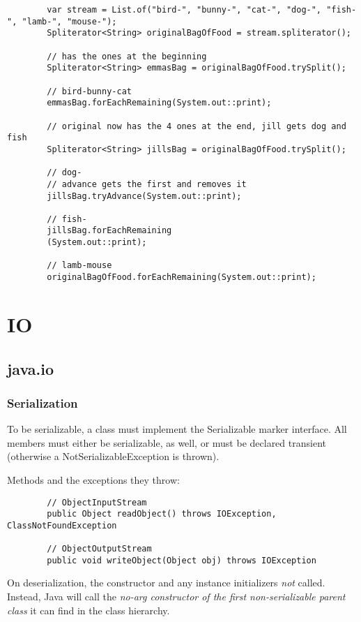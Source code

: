 \documentclass{scrartcl}
\begin{document}
    \begin{lstlisting}
        var stream = List.of("bird-", "bunny-", "cat-", "dog-", "fish-", "lamb-", "mouse-");
        Spliterator<String> originalBagOfFood = stream.spliterator();

        // has the ones at the beginning
        Spliterator<String> emmasBag = originalBagOfFood.trySplit();

        // bird-bunny-cat
        emmasBag.forEachRemaining(System.out::print);

        // original now has the 4 ones at the end, jill gets dog and fish
        Spliterator<String> jillsBag = originalBagOfFood.trySplit();

        // dog-
        // advance gets the first and removes it
        jillsBag.tryAdvance(System.out::print);

        // fish-
        jillsBag.forEachRemaining
        (System.out::print);

        // lamb-mouse
        originalBagOfFood.forEachRemaining(System.out::print);
    \end{lstlisting}

\section{IO}
\subsection{java.io}
\subsubsection{Serialization}

    To be serializable, a class must implement the Serializable marker interface.
    All members must either be serializable, as well, or must be declared transient (otherwise
    a NotSerializableException is thrown).

    Methods and the exceptions they throw:

    \begin{lstlisting}
        // ObjectInputStream
        public Object readObject() throws IOException, ClassNotFoundException

        // ObjectOutputStream
        public void writeObject(Object obj) throws IOException
    \end{lstlisting}

    On deserialization, the constructor and any instance initializers \textit{not} called.
    Instead, Java will call the \textit{no-­arg constructor of the first non-serializable parent class} it can find in the class hierarchy.
\end{document}
